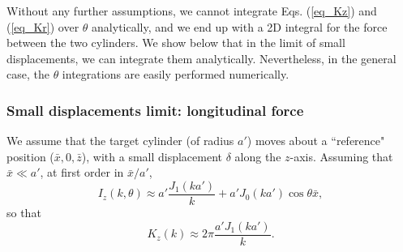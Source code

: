 \documentclass[12pt]{iopart}
\begin{document}
Without any further assumptions, we cannot integrate Eqs. (\ref{eq_Kz}) and (\ref{eq_Kr}) over $\theta$ analytically, and we end up with a 2D integral for the force between the two cylinders. We show below that in the limit of small displacements, we can integrate them analytically. Nevertheless, in the general case, the $\theta$ integrations are easily performed numerically.


\subsubsection{Small displacements limit: longitudinal force}

We assume that the target cylinder (of radius $a'$) moves about a ``reference" position ($\bar{x}, 0, \bar{z}$), with a small displacement $\delta$ along the $z$-axis. Assuming that $\bar{x}\ll a'$, at first order in $\bar{x}/a'$,
\begin{equation}
I_z(k, \theta) \approx a' \frac{J_1(ka')}{k} + a' J_0(ka') \cos\theta \bar{x},
\end{equation}
so that
\begin{equation}
K_z(k) \approx 2\pi \frac{a'J_1(ka')}{k}.
\end{equation}
\end{document}
